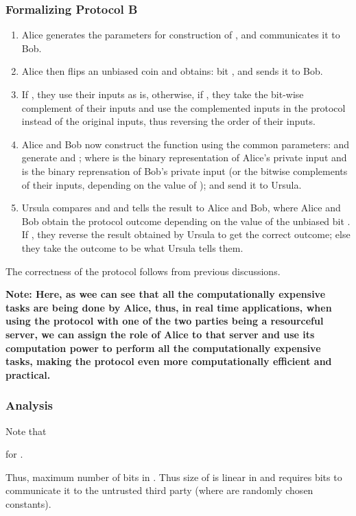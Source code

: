 \documentclass[11pt, letterpaper, romanappendices, onecolumn]{article}
\theoremstyle{plain}\newtheorem{thm}{Theorem}[section]
\theoremstyle{definition}
\theoremstyle{remark}
\begin{document}
\subsubsection{Formalizing Protocol \textsf{B}} \label{protb}
\begin{enumerate}
	\item Alice generates   the parameters for construction of , and communicates it to Bob.
	\item Alice then flips an unbiased coin and obtains: bit , and sends it to Bob.
	\item If , they use their inputs as is, otherwise, if , they take the bit-wise complement of their inputs and use the complemented inputs in the protocol instead of the original inputs, thus reversing the order of their inputs.
	\item Alice and Bob now construct the function  using the common parameters:  and generate  and ; where  is the binary representation of Alice's private input and  is the binary reprensation of Bob's private input (or the bitwise complements of their inputs, depending on the value of ); and send it to Ursula.
	\item Ursula compares  and  and tells the result to Alice and Bob, where Alice and Bob obtain the protocol outcome depending on the value of the unbiased bit . If , they reverse the result obtained by Ursula to get the correct outcome; else they take the outcome to be what Ursula tells them.
\end{enumerate}

The correctness of the protocol follows from previous discussions.

\textbf{Note: Here, as wee can see that all the computationally expensive tasks are being done by Alice, thus, in real time applications, when using the protocol with one of the two parties being a resourceful server, we can assign the role of Alice to that server and use its computation power to perform all the computationally expensive tasks, making the protocol even more computationally efficient and practical.}

\subsubsection{Analysis}
\par Note that

for .

\par Thus, maximum number of bits in . Thus size of  is linear in  and requires  bits to communicate it to the untrusted third party (where  are randomly chosen constants).
\end{document}
